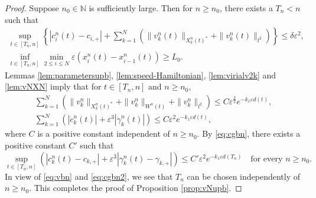 \documentclass[11pt]{amsart}
\theoremstyle{remark}
\numberwithin{equation}{section}
\begin{document}
\begin{proof}
Suppose $n_0\in{\mathbb{N}}$ is sufficiently large. Then for $n\ge n_0$,
there exists a $T_n<n$ such that
\begin{gather*} \sup_{t\in[T_n,n]}\left\{|c_i^n(t)-c_{i,+}|
+\sum_{k=1}^N(\|v_k^n(t)\|_{X_k^n(t)^*}+\|v_k^n(t)\|_{l^2})
\right\}\le \delta{\varepsilon}^2,
\\ \inf_{t\in[T_n,n]}\min_{2\le i\le N}{\varepsilon}(x_{i}^n(t)-x_{i-1}^n(t))\ge L_0.
\end{gather*}
Lemmas \ref{lem:parametersupb}, \ref{lem:speed-Hamiltonian},
\ref{lem:virialv2k} and \ref{lem:vNXN}  imply that for $t\in[T_n,n]$
and $n\ge n_0$,
\begin{gather}
\label{eq:vbn}
\sum_{k=1}^N(\|v_k^n\|_{X_k^n(t)^*}+\|v_k^n\|_{W^n(t)}+\|v_k^n\|_{l^2})\le
C{\varepsilon}^{\frac32}e^{-k_1{\varepsilon} d(t)},\\
\label{eq:cgbn}
\sum_{k=1}^N(|\dot{c}_k^n(t)|+{\varepsilon}^3|\dot{\gamma}_k^n(t)|)\le
C{\varepsilon}^2e^{-k_1{\varepsilon} d(t)},
\end{gather}
where $C$ is a positive constant independent of $n\ge n_0$.
By \eqref{eq:cgbn}, there exists a positive constant $C'$ such that
\begin{equation}
  \label{eq:cgbn2}
\sup_{t\in[T_n,n]}(|c_k^n(t)-c_{k,+}|+{\varepsilon}^3|\gamma_k^n(t)-\gamma_{k,+}|)
\le C'{\varepsilon}^2e^{-k_1{\varepsilon} d(T_n)}\quad\text{for every $n\ge n_0$.}
\end{equation}
In view of \eqref{eq:vbn} and \eqref{eq:cgbn2}, we see that $T_n$ can
be chosen independently of $n\ge n_0$. This completes the proof of
Proposition \ref{prop:vNupb}.
\end{proof}
\end{document}
